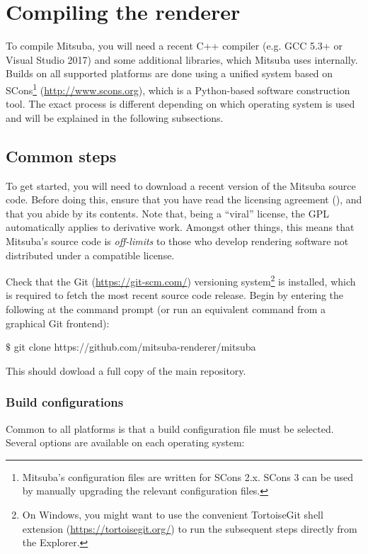 \section{Compiling the renderer}
\label{sec:compiling}
To compile Mitsuba, you will need a recent C++ compiler (e.g. GCC 5.3+ or
Visual Studio 2017) and some additional libraries, which Mitsuba uses internally.
Builds on all supported platforms are done using a unified system
based on SCons\footnote{Mitsuba's configuration files are written for SCons 2.x. SCons 3 can be used by manually upgrading the relevant configuration files.} (\url{http://www.scons.org}), which is a Python-based
software construction tool. The exact process is different depending on
which operating system is used and will be explained in the following subsections.

\subsection{Common steps}
To get started, you will need to download a recent version of the Mitsuba source code. Before
doing this, ensure that you have read the licensing agreement
(), and that you abide by its contents. Note that, being a ``viral''
license, the GPL automatically applies to derivative work. Amongst other things, this
means that Mitsuba's source code is \emph{off-limits} to those who develop rendering
software not distributed under a compatible license.

Check that the Git (\url{https://git-scm.com/}) versioning system\footnote{On
Windows, you might want to use the convenient TortoiseGit shell extension
(\url{https://tortoisegit.org/}) to run the subsequent steps directly from the
Explorer.} is installed, which is required to fetch the most recent source code
release.
Begin by entering the following at the command prompt (or run an equivalent command from a graphical Git frontend):
\begin{shell}
$\texttt{\$}$ git clone https://github.com/mitsuba-renderer/mitsuba
\end{shell}
This should dowload a full copy of the main repository.

\subsubsection{Build configurations}
Common to all platforms is that a build configuration file must be selected. Several options are
available on each operating system:
